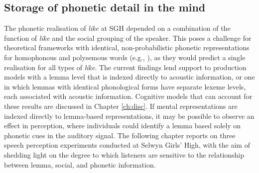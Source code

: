 \subsection{Storage of phonetic detail in the mind}




The phonetic realisation of \textit{like} at SGH depended on a combination of the function of \textit{like} and the social grouping of the speaker. This poses a challenge for theoretical frameworks with identical, non-probabilistic phonetic representations for homophonous and polysemous words (e.g., \citealt{leveltetal1999}), as they would predict a single realisation for all types of \textit{like}. The current findings lend support to production models with a lemma level that is indexed directly to acoustic information, or one in which lemmas with identical phonological forms have separate lexeme levels, each associated with acoustic information. Cognitive models that can account for these results are discussed in Chapter \ref{ch:disc}. If mental representations are indexed directly to lemma-based representations, it may be possible to observe an effect in perception, where individuals could identify a lemma based solely on phonetic cues in the auditory signal. The following chapter reports on three speech perception experiments conducted at Selwyn Girls' High, with the aim of shedding light on the degree to which listeners are sensitive to the relationship between lemma, social, and phonetic information.













